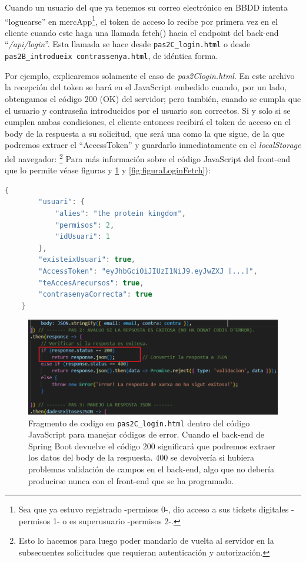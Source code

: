 \documentclass[a4paper,12pt]{report}
\begin{document}
	Cuando un usuario del que ya tenemos su correo electrónico en BBDD intenta ``loguearse'' en mercApp\footnote{Sea que ya estuvo registrado -permisos 0-, dio acceso a sus tickets digitales -permisos 1- o es superusuario -permisos 2-.}, el token de acceso lo recibe por primera vez en el cliente cuando este haga una llamada fetch() hacia el endpoint del back-end ``\textit{/api/login}''. Esta llamada se hace desde \texttt{pas2C\_login.html} o desde \texttt{pas2B\_introdueix contrassenya.html}, de idéntica forma.
	
	
	Por ejemplo, explicaremos solamente el caso de \textit{pas2Clogin.html}. En este archivo la recepción del token se hará en el JavaScript embedido cuando, por un lado, obtengamos el código 200 (OK) del servidor; pero también, cuando se cumpla que el usuario y contraseña introducidos por el usuario son correctos. Si y solo si se cumplen ambas condiciones, el cliente entonces recibirá el token de acceso en el body de la respuesta a su solicitud, que será una como la que sigue, de la que podremos extraer el ``AccessToken'' y guardarlo inmediatamente en el \textit{localStorage} del navegador: \footnote{Esto lo hacemos para luego poder mandarlo de vuelta al servidor en la subsecuentes solicitudes que requieran autenticación y autorización.} Para más información sobre el código JavaScript del front-end que lo permite véase figuras y \ref{fig:FetchCodisResponseFRONT} y \ref{fig:figuraLoginFetch}):
	
\begin{lstlisting}[language=Java, basicstyle=\ttfamily\footnotesize, keywordstyle=\color{magenta}]
	{
		"usuari": {
			"alies": "the protein kingdom",
			"permisos": 2,
			"idUsuari": 1
		},
		"existeixUsuari": true,
		"AccessToken": "eyJhbGciOiJIUzI1NiJ9.eyJwZXJ [...]",
		"teAccesArecursos": true,
		"contrasenyaCorrecta": true
	}
\end{lstlisting}
	

	
	\setlength{\belowcaptionskip}{3pt}
	\FloatBarrier
	\begin{figure}[H]
		\centering
		\caption{Fragmento de codigo en \texttt{pas2C\_login.html} dentro del código JavaScript para manejar códigos de error. Cuando el back-end de Spring Boot devuelve el código 200 significará que podremos extraer los datos del body de la respuesta. 400 se devolvería si hubiera problemas validación de campos en el back-end, algo que no debería producirse nunca con el front-end que se ha programado.}
		\includegraphics[width=1\textwidth]{img/FetchCodisResponseFRONT.png}
		
		\label{fig:FetchCodisResponseFRONT} 
	\end{figure}
	\FloatBarrier
	
\end{document}
